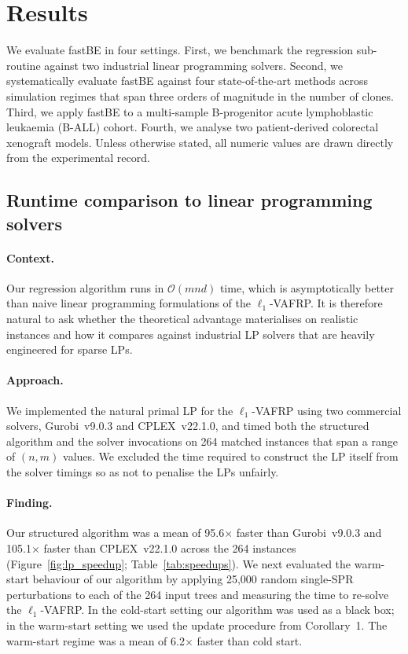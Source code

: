 \documentclass[11pt]{article}
\begin{document}
\section{Results}
\label{sec:results}

We evaluate fastBE in four settings. First, we benchmark the regression sub-routine against two industrial linear programming solvers. Second, we systematically evaluate fastBE against four state-of-the-art methods across simulation regimes that span three orders of magnitude in the number of clones. Third, we apply fastBE to a multi-sample B-progenitor acute lymphoblastic leukaemia (B-ALL) cohort. Fourth, we analyse two patient-derived colorectal xenograft models. Unless otherwise stated, all numeric values are drawn directly from the experimental record.

\subsection{Runtime comparison to linear programming solvers}

\paragraph{Context.}
Our regression algorithm runs in $\mathcal{O}(mnd)$ time, which is asymptotically better than naive linear programming formulations of the $\ell_1$-VAFRP. It is therefore natural to ask whether the theoretical advantage materialises on realistic instances and how it compares against industrial LP solvers that are heavily engineered for sparse LPs.

\paragraph{Approach.}
We implemented the natural primal LP for the $\ell_1$-VAFRP using two commercial solvers, Gurobi~v9.0.3 and CPLEX~v22.1.0, and timed both the structured algorithm and the solver invocations on 264 matched instances that span a range of $(n, m)$ values. We excluded the time required to construct the LP itself from the solver timings so as not to penalise the LPs unfairly.

\paragraph{Finding.}
Our structured algorithm was a mean of 95.6$\times$ faster than Gurobi~v9.0.3 and 105.1$\times$ faster than CPLEX~v22.1.0 across the 264 instances (Figure~\ref{fig:lp_speedup}; Table~\ref{tab:speedups}). We next evaluated the warm-start behaviour of our algorithm by applying 25{,}000 random single-SPR perturbations to each of the 264 input trees and measuring the time to re-solve the $\ell_1$-VAFRP. In the cold-start setting our algorithm was used as a black box; in the warm-start setting we used the update procedure from Corollary~1. The warm-start regime was a mean of 6.2$\times$ faster than cold start.
\end{document}
